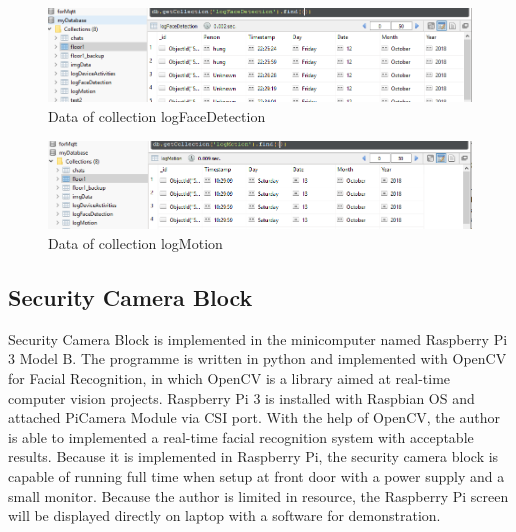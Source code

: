     \begin{figure}[!ht]
        \begin{center}
        \includegraphics[scale=0.55]{images/logFace.png}
        \caption{Data of collection logFaceDetection}
        \label{fig:logFace}
        \end{center}
    \end{figure}
    \begin{figure}[!ht]
        \begin{center}
        \includegraphics[scale=0.55]{images/logMotion.png}
        \caption{Data of collection logMotion}
        \label{fig:logMotion}
        \end{center}
    \end{figure}
 
    \subsection{Security Camera Block}
    Security Camera Block is implemented in the minicomputer named Raspberry Pi 3 Model B. The programme is written in python and implemented with OpenCV for Facial Recognition, in which OpenCV is a library aimed at real-time computer vision projects. Raspberry Pi 3 is installed with Raspbian OS and attached PiCamera Module via CSI port. With the help of OpenCV, the author is able to implemented a real-time facial recognition system with acceptable results. Because it is implemented in Raspberry Pi, the security camera block is capable of running full time when setup at front door with a power supply and a small monitor. Because the author is limited in resource, the Raspberry Pi screen will be displayed directly on laptop with a software for demonstration.



        





